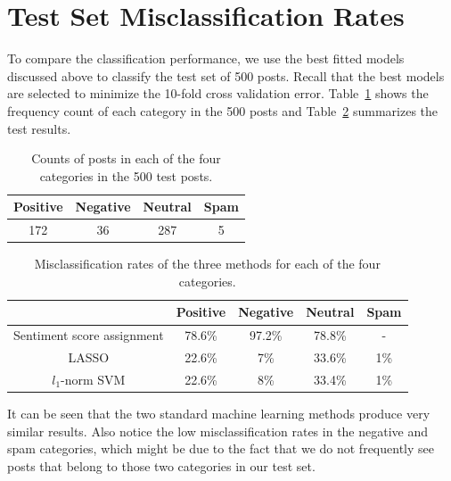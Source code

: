 \documentclass[11pt]{article}
\newcommand{\1}[1]{{\mathbf 1}\left\{#1\right\}}        %
\begin{document}
\clearpage
\section{Test Set Misclassification Rates}

To compare the classification performance, we use the best fitted models discussed above to classify the test set of 500 posts. Recall that the best models are selected to minimize the 10-fold cross validation error. Table~\ref{tb:testcounts} shows the frequency count of each category in the 500 posts and Table~\ref{tb:testmis} summarizes the test results. 

\begin{table}[!h]
\caption{Counts of posts in each of the four categories in the 500 test posts.}
\begin{center}
\begin{tabular}{|c|c|c|c|}
\hline
Positive & Negative & Neutral & Spam \\ \hline
 172      & 36   &   287   &  5 \\ \hline
\end{tabular}
\end{center}
\label{tb:testcounts}
\end{table}%


\begin{table}[!h]
\caption{Misclassification rates of the three methods for each of the four categories.}
\begin{center}
\begin{tabular}{|c|c|c|c|c|}
\hline
              &  			Positive & Negative & Neutral & Spam  \\ \hline
Sentiment score assignment & 	78.6\%		&	97.2\%	&  78.8\%	& -  \\ \hline
LASSO               & 	22.6\%   &   7\%   &   33.6\%    &    1\% \\ \hline
$l_1$-norm SVM       &       22.6\%  &    8\%    &  33.4\%   &     1\% \\ \hline
\end{tabular}
\end{center}
\label{tb:testmis}
\end{table}%



It can be seen that the two standard machine learning methods produce very similar results. Also notice the low misclassification rates in the negative and spam categories, which might be due to the fact that we do not frequently see posts that belong to those two categories in our test set.
\end{document}
